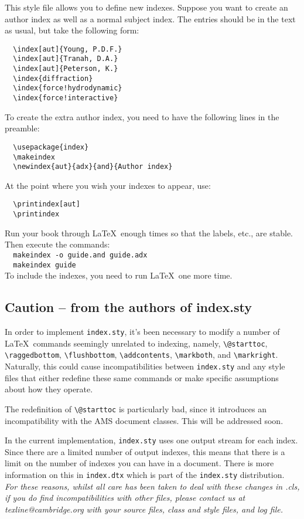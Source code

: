 This style file allows you to define new indexes. Suppose you want to create an author index as well as a normal subject index. The entries should be in the text as usual, but take the following form:
\begin{verbatim}
  \index[aut]{Young, P.D.F.}
  \index[aut]{Tranah, D.A.}
  \index[aut]{Peterson, K.}
  \index{diffraction}
  \index{force!hydrodynamic}
  \index{force!interactive}
\end{verbatim}
To create the extra author index, you need to have the following lines in the preamble:
\begin{verbatim}
  \usepackage{index}
  \makeindex
  \newindex{aut}{adx}{and}{Author index}
\end{verbatim}
At the point where you wish your indexes to appear, use:
\begin{verbatim}
  \printindex[aut]
  \printindex
\end{verbatim}
Run your book through \LaTeX\ enough times so that the labels, etc., are stable. Then execute the commands:\\[0.5\baselineskip]
\verb"  makeindex -o "\texttt{\cambridge guide.and \cambridge guide.adx}\\
\verb"  makeindex "\texttt{\cambridge guide}\\[0.5\baselineskip]
To include the indexes, you need to run \LaTeX\ one more time.

\subsection{Caution -- from the authors of index.sty}

In order to implement \verb"index.sty", it's been necessary to modify a number of \LaTeX\ commands seemingly unrelated to indexing, namely, \verb"\@starttoc", \verb"\raggedbottom", \verb"\flushbottom", \verb"\addcontents", \verb"\markboth", and \verb"\markright". Naturally, this could cause incompatibilities between \texttt{index.sty} and any style files that either redefine these same commands or make specific assumptions about how they operate.

The redefinition of \verb"\@starttoc" is particularly bad, since it introduces an incompatibility with the AMS document classes. This will be addressed soon.

In the current implementation, \texttt{index.sty} uses one output stream for each index.  Since there are a limited number of output indexes, this means that there is a limit on the number of indexes you can have in a document.  There is more information on this in \verb"index.dtx" which is part of the \verb"index.sty" distribution.\\[\baselineskip]
%
\textit{For these reasons, whilst all care has been taken to deal with these changes in \cambridge.cls, if you do find incompatibilities with other files, please contact us at texline@cambridge.org with your source files, class and style files, and log file.}

\endinput
